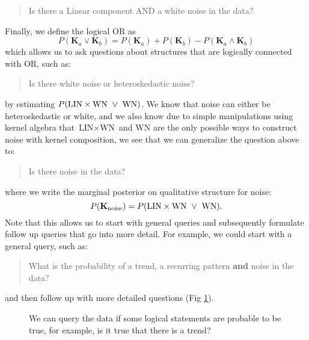 \begin{quotation}
Is there a Linear component AND a white noise in the data? 
\end{quotation}
Finally, we define the logical OR as
\begin{equation}
P(\mathbf{K}_a \lor \mathbf{K}_b) = P(\mathbf{K}_a) + P(\mathbf{K}_b) - P(\mathbf{K}_a \land \mathbf{K}_b)
\end{equation}
which allows us to ask questions about structures that are logically connected with OR, such as:
\begin{quotation}
Is there white noise or heteroskedastic noise?
\end{quotation}
by estimating $P(\text{LIN} \times \text{WN}\;\;{\large\lor}\;\; \text{WN})$.
We know that noise can either be heteroskedastic or white,
and we also know due to simple manipulations using kernel algebra
that  $\text{LIN} \times \text{WN}$ and $\text{WN}$ are the only possible ways to construct noise with kernel composition, we see that we can generalize the 
question above to:
\begin{quotation}
Is there noise in the data? 
\end{quotation}
where we write the marginal posterior on qualitative structure for noise:
\begin{equation}
P(\mathbf{K}_{\text{noise}}) = P(\text{LIN} \times \text{WN}\;\;{\large\lor}\;\; \text{WN}).
\end{equation}
Note that this allows us to start with general queries and 
subsequently formulate follow up queries that go into more detail.
For example, we could start with a general query, such as:
\begin{quotation}
What is the probability of a trend, a recurring pattern {\bf and} noise in the data?
\end{quotation}
and then follow up with more detailed questions (Fig \ref{fig:query}).
\begin{figure}
\centering

\caption{We can query the data if some logical statements are probable to be true, for example, is it true that there is a trend?}\label{fig:query}
\end{figure}
